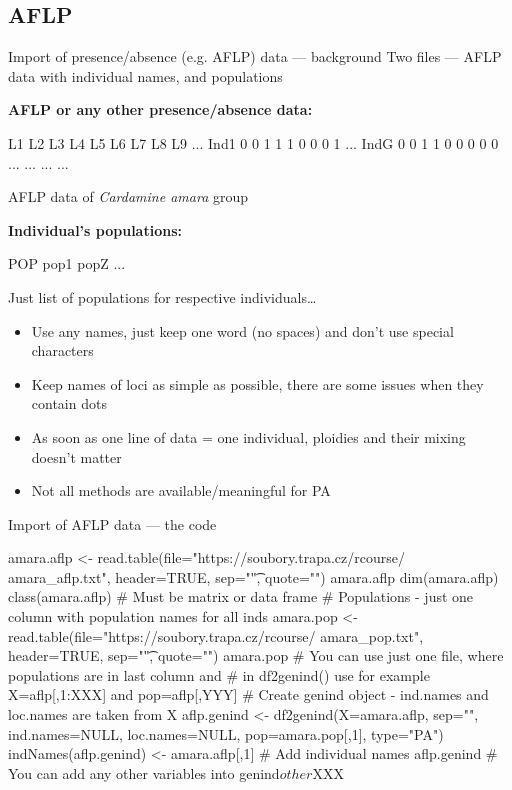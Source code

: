 \documentclass[compress, ucs, xelatex, 11pt, xcolor=svgnames, aspectratio=169,
	hyperref={
		bookmarks=true,
		unicode=true,
		colorlinks=true,
		pdftitle={Molecular data in R},
		plainpages=false,
		pdfauthor={Vojtech Zeisek},
		pdfsubject={Course about phylogeny and evolution in R},
		pdfcreator={XeLaTeX},
		pdfkeywords={R, evolution, phylogeny, molecular data},
		linkcolor=Crimson, %
		anchorcolor=Magenta, %
		citecolor=Magenta, %
		filecolor=Magenta, %
		menucolor=Magenta, %
		urlcolor=DodgerBlue, %
		pdftex},
	url={hyphens, lowtilde} %
	]{beamer}
\begin{document}
\subsection{AFLP}

\begin{frame}[fragile]{Import of presence/absence (e.g. AFLP) data --- background}
	Two files --- AFLP data with individual names, and populations
	\vfill
	\begin{multicols}{2}
	\vfill
	\textbf{AFLP or any other presence/absence data:}
	\vfill
	\begin{spluscode}
        L1 L2 L3 L4 L5 L6 L7 L8 L9 ...
    Ind1 0  0  1  1  1  0  0  0  1 ...
    IndG 0  0  1  1  0  0  0  0  0 ...
     ...  ...                      ...
	\end{spluscode}
	\vfill
	\begin{footnotesize}
		AFLP data of \textit{Cardamine amara} group
	\end{footnotesize}
	\vfill
	\textbf{Individual's populations:}
	\vfill
	\begin{spluscode}
    POP
    pop1
    popZ
    ...
	\end{spluscode}
	\vfill
	\begin{footnotesize}
		Just list of populations for respective individuals\ldots
	\end{footnotesize}
	\columnbreak
	\begin{itemize}
		\item Use any names, just keep one word (no spaces) and don't use special characters
		\item Keep names of loci as simple as possible, there are some issues when they contain dots
		\item As soon as one line of data = one individual, ploidies and their mixing doesn't matter
		\item Not all methods are available/meaningful for PA
	\end{itemize}
	\end{multicols}
\end{frame}

\begin{frame}[fragile]{Import of AFLP data --- the code}
	\begin{spluscode}
    amara.aflp <- read.table(file="https://soubory.trapa.cz/rcourse/
      amara_aflp.txt", header=TRUE, sep="\t", quote="")
    amara.aflp
    dim(amara.aflp)
    class(amara.aflp) # Must be matrix or data frame
    # Populations - just one column with population names for all inds
    amara.pop <- read.table(file="https://soubory.trapa.cz/rcourse/
      amara_pop.txt", header=TRUE, sep="\t", quote="")
    amara.pop
    # You can use just one file, where populations are in last column and
    # in df2genind() use for example X=aflp[,1:XXX] and pop=aflp[,YYY]
    # Create genind object - ind.names and loc.names are taken from X
    aflp.genind <- df2genind(X=amara.aflp, sep="", ind.names=NULL,
      loc.names=NULL, pop=amara.pop[,1], type="PA")
    indNames(aflp.genind) <- amara.aflp[,1] # Add individual names
    aflp.genind
    # You can add any other variables into genind$other$XXX
	\end{spluscode}
\end{frame}
\end{document}
